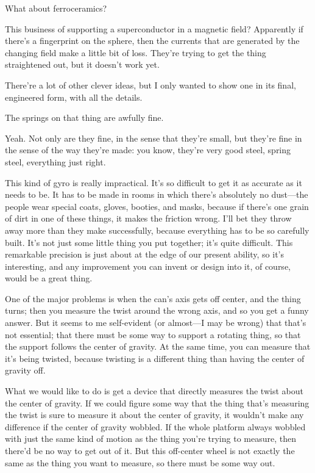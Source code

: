 \documentclass[11pt,oneside]{article}
\begin{document}
What about ferroceramics?\par

This business of supporting a superconductor in a magnetic field? Apparently if there's a fingerprint on the sphere, then the currents that are generated by the changing field make a little bit of loss. They're trying to get the thing straightened out, but it doesn't work yet.\par

There're a lot of other clever ideas, but I only wanted to show one in its final, engineered form, with all the details.\par

The springs on that thing are awfully fine.\par

Yeah. Not only are they fine, in the sense that they're small, but they're fine in the sense of the way they're made: you know, they're very good steel, spring steel, everything just right.\par

This kind of gyro is really impractical. It's so difficult to get it as accurate as it needs to be. It has to be made in rooms in which there's absolutely no dust---the people wear special coats, gloves, booties, and masks, because if there's one grain of dirt in one of these things, it makes the friction wrong. I'll bet they throw away more than they make successfully, because everything has to be so carefully built. It's not just some little thing you put together; it's quite difficult. This remarkable precision is just about at the edge of our present ability, so it's interesting, and any improvement you can invent or design into it, of course, would be a great thing.\par

One of the major problems is when the can's axis gets off center, and the thing turns; then you measure the twist around the wrong axis, and so you get a funny answer. But it seems to me self-evident (or almost---I may be wrong) that that's not essential; that there must be some way to support a rotating thing, so that the support follows the center of gravity. At the same time, you can measure that it's being twisted, because twisting is a different thing than having the center of gravity off.\par

What we would like to do is get a device that directly measures the twist about the center of gravity. If we could figure some way that the thing that's measuring the twist is sure to measure it about the center of gravity, it wouldn't make any difference if the center of gravity wobbled. If the whole platform always wobbled with just the same kind of motion as the thing you're trying to measure, then there'd be no way to get out of it. But this off-center wheel is not exactly the same as the thing you want to measure, so there must be some way out.\par
\end{document}
